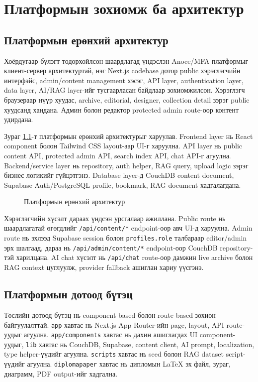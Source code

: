 
\chapter{Платформын зохиомж ба архитектур}
\label{Chapter3}

\section{Платформын ерөнхий архитектур}
Хоёрдугаар бүлэгт тодорхойлсон шаардлагад үндэслэн Anoce/MFA платформыг клиент-сервер архитектуртай, нэг Next.js codebase дотор public хэрэглэгчийн интерфэйс, admin/content management хэсэг, API layer, authentication layer, data layer, AI/RAG layer-ийг тусгаарласан байдлаар зохиомжилсон. Хэрэглэгч браузераар нүүр хуудас, archive, editorial, designer, collection detail зэрэг public хуудсанд хандана. Админ болон редактор protected admin route-оор контент удирдана.

Зураг \ref{fig:ch3-general-architecture}-т платформын ерөнхий архитектурыг харуулав. Frontend layer нь React component болон Tailwind CSS layout-аар UI-г харуулна. API layer нь public content API, protected admin API, search index API, chat API-г агуулна. Backend/service layer нь repository, auth helper, RAG query, upload logic зэрэг бизнес логикийг гүйцэтгэнэ. Database layer-д CouchDB content document, Supabase Auth/PostgreSQL profile, bookmark, RAG document хадгалагдана.

\begin{figure}[htbp]
  \centering
  \resizebox{\textwidth}{!}{}
  \caption[Платформын ерөнхий архитектур]{Платформын ерөнхий архитектур}
  \label{fig:ch3-general-architecture}
\end{figure}

Хэрэглэгчийн хүсэлт дараах үндсэн урсгалаар ажиллана. Public route нь шаардлагатай өгөгдлийг \texttt{/api/content/*} endpoint-оор авч UI-д харуулна. Admin route нь эхлээд Supabase session болон \texttt{profiles.role} талбараар editor/admin эрх шалгаад, дараа нь \texttt{/api/admin/content/*} endpoint-оор CouchDB repository-тэй харилцана. AI chat хүсэлт нь \texttt{/api/chat} route-оор дамжин live archive болон RAG context цуглуулж, provider fallback ашиглан хариу үүсгэнэ.

\section{Платформын дотоод бүтэц}
Төслийн дотоод бүтэц нь component-based болон route-based зохион байгуулалттай. \texttt{app} хавтас нь Next.js App Router-ийн page, layout, API route-уудыг агуулна. \texttt{app/components} хавтас нь дахин ашиглагдах UI component-уудыг, \texttt{lib} хавтас нь CouchDB, Supabase, content client, AI prompt, localization, type helper-үүдийг агуулна. \texttt{scripts} хавтас нь seed болон RAG dataset script-үүдийг агуулна. \texttt{diplomapaper} хавтас нь дипломын LaTeX эх файл, зураг, диаграмм, PDF output-ийг хадгална.

